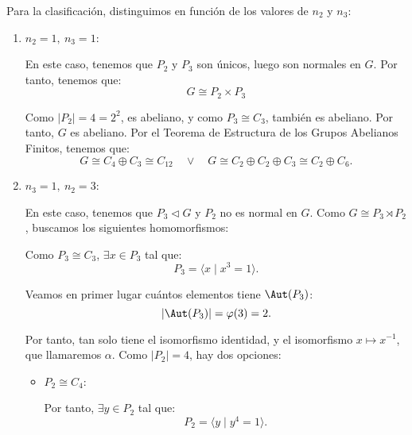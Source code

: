 \begin{ejercicio}
    Para la clasificación, distinguimos en función de los valores de \(n_2\) y \(n_3\):
    \begin{enumerate}
        \item \ul{$n_2=1,\ n_3=1$}:
        
        En este caso, tenemos que \(P_2\) y \(P_3\) son únicos, luego son normales en \(G\). Por tanto, tenemos que:
        \begin{equation*}
            G\cong P_2\times P_3
        \end{equation*}

        Como $|P_2|=4=2^2$, es abeliano, y como $P_3\cong C_3$, también es abeliano. Por tanto, \(G\) es abeliano. Por el Teorema de Estructura de los Grupos Abelianos Finitos, tenemos que:
        \begin{equation*}
            G\cong C_4\oplus C_3\cong C_{12}
            \quad \lor \quad
            G\cong C_2\oplus C_2\oplus C_3 \cong C_2\oplus C_6.
        \end{equation*}

        \item \ul{$n_3=1,\ n_2=3$}:
        
        En este caso, tenemos que \(P_3\lhd G\) y \(P_2\) no es normal en \(G\). Como $G\cong P_3\rtimes P_2$, buscamos los siguientes homomorfismos:

        Como $P_3\cong C_3$, $\exists x\in P_3$ tal que:
        \begin{equation*}
            P_3 = \langle x\mid x^3=1\rangle.
        \end{equation*}

        Veamos en primer lugar cuántos elementos tiene \(\Aut(P_3)\):
        \begin{equation*}
            |\Aut(P_3)| = \varphi(3) = 2.
        \end{equation*}

        Por tanto, tan solo tiene el isomorfismo identidad, y el isomorfismo $x\mapsto x^{-1}$, que llamaremos $\alpha$. Como $|P_2|=4$, hay dos opciones:
        \begin{itemize}
            \item $P_2\cong C_4$:
            

            Por tanto, $\exists y\in P_2$ tal que:
            \begin{equation*}
                P_2 = \langle y\mid y^4=1\rangle.
            \end{equation*}
            

\end{itemize}
\end{enumerate}
\end{ejercicio}
